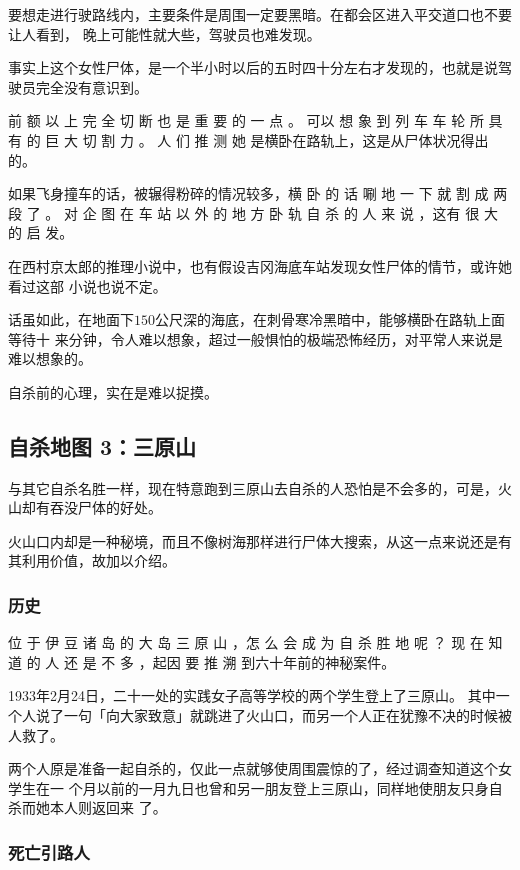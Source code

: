 \documentclass[UTF8]{ctexart}
\begin{document}
要想走进行驶路线内，主要条件是周围一定要黑暗。在都会区进入平交道口也不要让人看到， 晚上可能性就大些，驾驶员也难发现。

事实上这个女性尸体，是一个半小时以后的五时四十分左右才发现的，也就是说驾驶员完全没有意识到。 

前 额 以 上 完 全 切 断 也 是 重 要 的 一 点 。
可以 想 象 到 列 车 车 轮 所 具 有 的 巨 大 切 割 力 。
人 们 推 测 她 是横卧在路轨上，这是从尸体状况得出的。

如果飞身撞车的话，被辗得粉碎的情况较多，横 卧 的 话 唰 地 一 下 就 割 成 两 段 了 。
对 企 图 在 车 站 以 外 的 地 方 卧 轨 自 杀 的 人 来 说 ，这有 很 大 的 启 发。

在西村京太郎的推理小说中，也有假设吉冈海底车站发现女性尸体的情节，或许她看过这部
小说也说不定。

话虽如此，在地面下$150$公尺深的海底，在刺骨寒冷黑暗中，能够横卧在路轨上面等待十
来分钟，令人难以想象，超过一般惧怕的极端恐怖经历，对平常人来说是难以想象的。

自杀前的心理，实在是难以捉摸。


\subsection{自杀地图 3：三原山}

与其它自杀名胜一样，现在特意跑到三原山去自杀的人恐怕是不会多的，可是，火山却有吞没尸体的好处。

火山口内却是一种秘境，而且不像树海那样进行尸体大搜索，从这一点来说还是有其利用价值，故加以介绍。

\subsubsection{历史}

位 于 伊 豆 诸 岛 的 大 岛 三 原 山 ，怎 么 会 成 为 自 杀 胜 地 呢 ？ 现 在 知 道 的 人 还 是 不 多 ，起因 要 推 溯 到六十年前的神秘案件。

1933年2月24日，二十一处的实践女子高等学校的两个学生登上了三原山。
其中一个人说了一句「向大家致意」就跳进了火山口，而另一个人正在犹豫不决的时候被人救了。

两个人原是准备一起自杀的，仅此一点就够使周围震惊的了，经过调查知道这个女学生在一
个月以前的一月九日也曾和另一朋友登上三原山，同样地使朋友只身自杀而她本人则返回来
了。

\subsubsection{死亡引路人}
\end{document}
